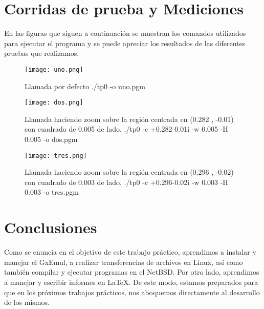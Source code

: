 \documentclass[a4paper,10pt,oneside]{article}
\begin{document}
	
\section{Corridas de prueba y Mediciones}

	En las figuras que siguen a continuación se muestran los comandos utilizados para ejecutar el programa y se puede apreciar los resultados de las diferentes pruebas que realizamos.	
	\begin{figure}[H]
		\begin{center}
			\texttt{[image: uno.png]}
		\end{center}
		\caption{Llamada por defecto ./tp0 -o uno.pgm} \label{Figura 1}
	\end{figure}

	\begin{figure}[H]
		\begin{center}
			\texttt{[image: dos.png]}
		\end{center}
		\caption{Llamada haciendo zoom sobre la región centrada en (0.282 , -0.01) con cuadrado de 0.005 de lado. ./tp0 -c +0.282-0.01i -w 0.005 -H 0.005 -o dos.pgm } \label{Figura 2}
	\end{figure}

	\begin{figure}[H]
		\begin{center}
			\texttt{[image: tres.png]}
		\end{center}
		\caption{Llamada haciendo zoom sobre la región centrada en (0.296 , -0.02) con cuadrado de 0.003 de lado. ./tp0 -c +0.296-0.02i -w 0.003 -H 0.003 -o tres.pgm } \label{Figura 3}
	\end{figure}
	
	\newpage

\section{Conclusiones}	
	Como se enuncia en el objetivo de este trabajo práctico, aprendimos a instalar y manejar el GxEmul, a realizar transferencias de archivos en Linux, así como también compilar y ejecutar programas en el NetBSD. Por otro lado,  aprendimos a manejar y escribir informes en \LaTeX{}.
	De este modo, estamos preparados para que en los próximos trabajos prácticos, nos aboquemos directamente al desarrollo de los mismos.
\end{document}
